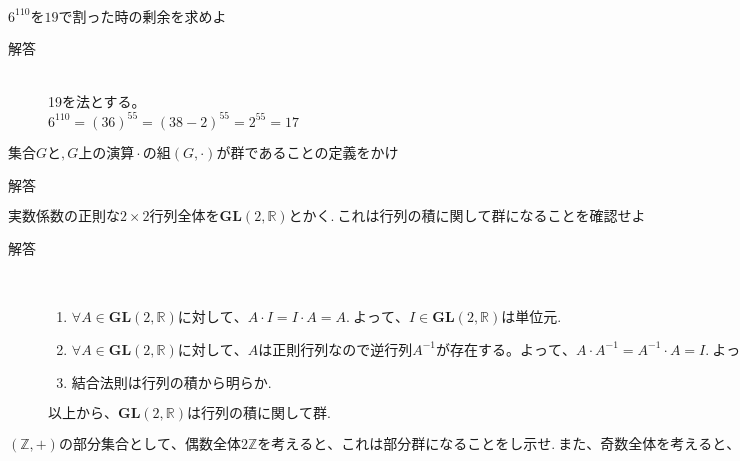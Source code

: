 \documentclass[dvipdfmx]{jsarticle}
\begin{document}
\begin{tcolorbox}[colframe=black!50,colback=white,colbacktitle=black!50,coltitle=white,fonttitle=\bfseries\sffamily,title=問題１]
$6^{110}を19で割った時の剰余を求めよ$
\end{tcolorbox}
\begin{description}
  \item[解答] \mbox{} \\
  19を法とする。\\
  $6^{110} = (36)^{55} = (38 - 2)^{55} = 2^{55} = 17$
\end{description}

\begin{tcolorbox}[colframe=black!50,colback=white,colbacktitle=black!50,coltitle=white,fonttitle=\bfseries\sffamily,title=問題2.1]
$集合Gと,G上の演算 \cdot の組(G, \cdot )が群であることの定義をかけ$
\end{tcolorbox}
\begin{description}
  \item[解答]
\end{description}

\begin{tcolorbox}[colframe=black!50,colback=white,colbacktitle=black!50,coltitle=white,fonttitle=\bfseries\sffamily,title=問題2.２]
$実数係数の正則な 2 \times 2 行列全体を \bm{GL}(2, \mathbb{R})とかく. \ これは行列の積に関して群になることを確認せよ$
\end{tcolorbox}

\begin{description}
  \item[解答] \mbox{} \\
  \begin{enumerate}
    \item $\forall A \in \bm{GL}(2,\mathbb{R})に対して、A \cdot I = I \cdot A = A. \ よって、I \in \bm{GL}(2, \mathbb{R})は単位元.$

    \item $\forall A \in \bm{GL}(2,\mathbb{R})に対して、Aは正則行列なので逆行列 A^{-1}が存在する。よって、A \cdot A^{-1} = A^{-1} \cdot A = I. \ よって逆元が存在する.$

    \item  結合法則は行列の積から明らか.
  \end{enumerate}
  $以上から、\bm{GL}(2,\mathbb{R})は行列の積に関して群.$
\end{description}

\begin{tcolorbox}[colframe=black!50,colback=white,colbacktitle=black!50,coltitle=white,fonttitle=\bfseries\sffamily,title=問題2.3]
$(\mathbb{Z}, +)の部分集合として、偶数全体2\mathbb{Z}を考えると、これは部分群になることをし示せ. \ また、奇数全体を考えると、部分群にならないことを示せ$
\end{tcolorbox}
\end{document}
